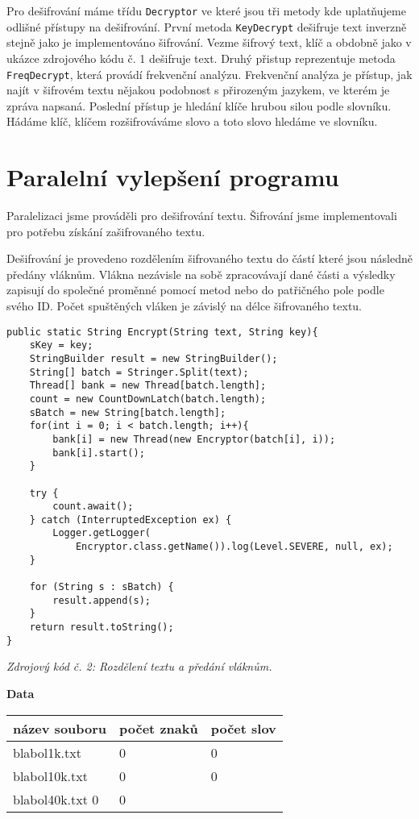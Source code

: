 \documentclass{article}
\begin{document}
Pro dešifrování máme třídu \texttt{Decryptor} ve které jsou tři metody kde uplatňujeme
odlišné přístupy na dešifrování. První metoda \texttt{KeyDecrypt} dešifruje text inverzně
stejně jako je implementováno šifrování. Vezme šifrový text, klíč a obdobně jako v ukázce
zdrojového kódu č. 1 dešifruje text. Druhý přistup reprezentuje metoda \texttt{FreqDecrypt},
která provádí frekvenční analýzu. Frekvenční analýza je přístup, jak najít v šifrovém textu
nějakou podobnost s přirozeným jazykem, ve kterém je zpráva napsaná. Poslední přístup je
hledání klíče hrubou silou podle slovníku. Hádáme klíč, klíčem rozšifrováváme slovo a toto
slovo hledáme ve slovníku.
\newline

\section{Paralelní vylepšení programu}
Paralelizaci jsme prováděli pro dešifrování textu. Šifrování jsme implementovali pro
potřebu získání zašifrovaného textu.

Dešifrování je provedeno rozdělením šifrovaného textu do částí které jsou následně
předány vláknům. Vlákna nezávisle na sobě zpracovávají dané části a výsledky zapisují
do společné proměnné pomocí metod nebo do patřičného pole podle svého ID. Počet
spuštěných vláken je závislý na délce šifrovaného textu.

\begin{center}
\begin{lstlisting}
public static String Encrypt(String text, String key){
	sKey = key;
	StringBuilder result = new StringBuilder();
	String[] batch = Stringer.Split(text);
	Thread[] bank = new Thread[batch.length];
	count = new CountDownLatch(batch.length);
	sBatch = new String[batch.length];
	for(int i = 0; i < batch.length; i++){
		bank[i] = new Thread(new Encryptor(batch[i], i));
		bank[i].start();
	}
	
	try {
		count.await();
	} catch (InterruptedException ex) {
		Logger.getLogger(
			Encryptor.class.getName()).log(Level.SEVERE, null, ex);
	}
	
	for (String s : sBatch) {
		result.append(s);
	}
	return result.toString();
}
\end{lstlisting}
\vspace{1mm}
\textit{Zdrojový kód č. 2: Rozdělení textu a předání vláknům.}
\end{center}

\textbf{Data}
\newline
\begin{tabular}{ l | l | l }
  \textbf{název souboru} & počet znaků & počet slov \\
  \hline
  blabol1k.txt & 0 & 0 \\
  blabol10k.txt & 0 & 0 \\
  blabol40k.txt 0 & 0 \\
  \hline
\end{tabular}
\newline
\end{document}
